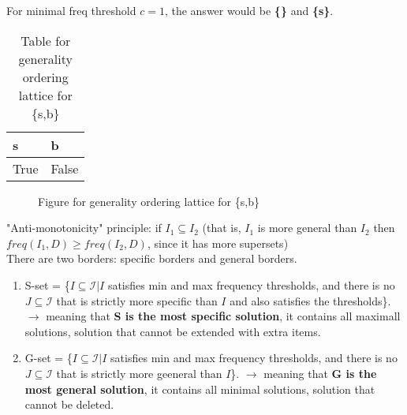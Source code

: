 \noindent
For minimal freq threshold $c = 1$, the answer would be \textbf{\{\}} and \textbf{\{s\}}.

\begin{table}[htbp]\footnotesize
    \centering
    \caption{Table for generality ordering lattice for \{s,b\}}
    \begin{tabularx}{4cm}{X|X}
    \toprule
    \textbf{s}&\textbf{b} \\
    \hline
    True&False \\
    \bottomrule
    \end{tabularx}
    \label{tab:generality_ordering_lattice}
\end{table}

\begin{figure}[htbp]
    \centering
    \caption{Figure for generality ordering lattice for \{s,b\}}
    \label{fig:generality_ordering_lattice}
\end{figure}

\noindent
"Anti-monotonicity" principle: if $I_{1} \subseteq I_{2}$ (that is, $I_{1}$ is more general than $I_{2}$ then $freq(I_{1},D) \ge freq(I_{2},D)$, since it has more supersets) \\

\noindent
There are two borders: specific borders and general borders. 
\begin{enumerate}
    \item S-set = \{$I \subseteq \mathscr{I} | I$ satisfies min and max frequency thresholds, and there is no $J \subseteq \mathscr{I}$ that is strictly more specific than $I$ and also satisfies the thresholds\}. $\rightarrow$ meaning that \textbf{S is the most specific solution}, it contains all maximall solutions, solution that cannot be extended with extra items. 
    \item G-set = \{$I \subseteq \mathscr{I} | I$ satisfies min and max frequency thresholds, and there is no $J \subseteq \mathscr{I}$ that is strictly more geeneral than $I$\}. $\rightarrow$ meaning that \textbf{G is the most general solution}, it contains all minimal solutions, solution that cannot be deleted.
\end{enumerate}

